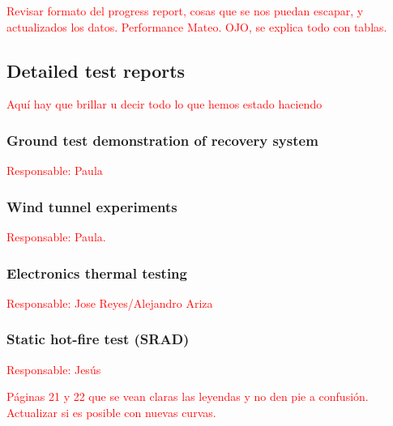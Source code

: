 \documentclass[11pt, a4paper]{article} %
\begin{document}
\vspace{1cm}

\textcolor{red}{Revisar formato del progress report, cosas que se nos puedan escapar, y actualizados los datos. Performance Mateo. OJO, se explica todo con tablas.}

\subsection{Detailed test reports} \textcolor{red}{Aquí hay que brillar u decir todo lo que hemos estado haciendo}

\subsubsection{Ground test demonstration of recovery system} \textcolor{red}{Responsable: Paula}

\subsubsection{Wind tunnel experiments} \textcolor{red}{Responsable: Paula.}

\subsubsection{Electronics thermal testing} \textcolor{red}{Responsable: Jose Reyes/Alejandro Ariza}

\subsubsection{Static hot-fire test (SRAD)} \textcolor{red}{Responsable: Jesús}

\vspace{1cm}

\textcolor{red}{Páginas 21 y 22 que se vean claras las leyendas y no den pie a confusión. Actualizar si es posible con nuevas curvas.}
\end{document}
